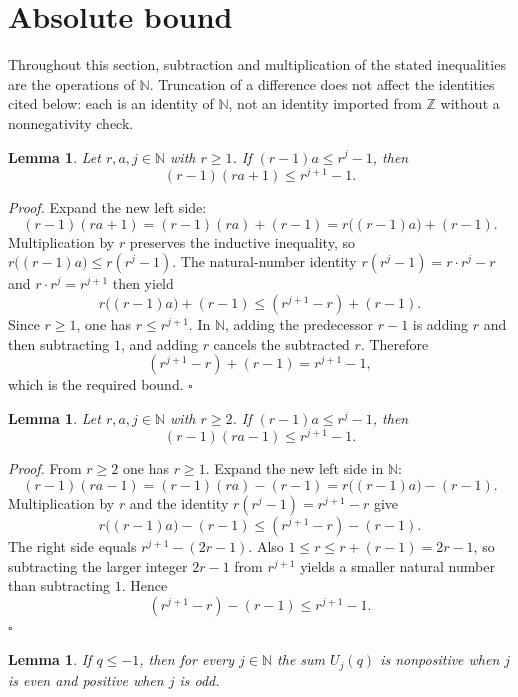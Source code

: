 \documentclass[11pt,letterpaper]{article}
\newcommand{\N}{\mathbb{N}}
\newcommand{\Z}{\mathbb{Z}}
\newtheorem{lemma}[theorem]{Lemma}
\newenvironment{proof}{\noindent\textit{Proof.}}{\hfill\(\square\)}
\begin{document}
\section{Absolute bound}

Throughout this section, subtraction and multiplication of the stated inequalities are the operations of \(\N\). Truncation of a difference does not affect the identities cited below: each is an identity of \(\N\), not an identity imported from \(\Z\) without a nonnegativity check.

\begin{lemma}
\label{lem:step-plus}
Let \(r,a,j\in\N\) with \(r\ge 1\). If \((r-1)a\le r^j-1\), then
\[
(r-1)(ra+1)\le r^{j+1}-1.
\]
\end{lemma}

\begin{proof}
Expand the new left side:
\[
(r-1)(ra+1)=(r-1)(ra)+(r-1)=r\bigl((r-1)a\bigr)+(r-1).
\]
Multiplication by \(r\) preserves the inductive inequality, so \(r\bigl((r-1)a\bigr)\le r(r^j-1)\). The natural-number identity \(r(r^j-1)=r\cdot r^j-r\) and \(r\cdot r^j=r^{j+1}\) then yield
\[
r\bigl((r-1)a\bigr)+(r-1)\le (r^{j+1}-r)+(r-1).
\]
Since \(r\ge 1\), one has \(r\le r^{j+1}\). In \(\N\), adding the predecessor \(r-1\) is adding \(r\) and then subtracting \(1\), and adding \(r\) cancels the subtracted \(r\). Therefore
\[
(r^{j+1}-r)+(r-1)=r^{j+1}-1,
\]
which is the required bound.
\end{proof}

\begin{lemma}
\label{lem:step-minus}
Let \(r,a,j\in\N\) with \(r\ge 2\). If \((r-1)a\le r^j-1\), then
\[
(r-1)(ra-1)\le r^{j+1}-1.
\]
\end{lemma}

\begin{proof}
From \(r\ge 2\) one has \(r\ge 1\). Expand the new left side in \(\N\):
\[
(r-1)(ra-1)=(r-1)(ra)-(r-1)=r\bigl((r-1)a\bigr)-(r-1).
\]
Multiplication by \(r\) and the identity \(r(r^j-1)=r^{j+1}-r\) give
\[
r\bigl((r-1)a\bigr)-(r-1)\le (r^{j+1}-r)-(r-1).
\]
The right side equals \(r^{j+1}-(2r-1)\). Also \(1\le r\le r+(r-1)=2r-1\), so subtracting the larger integer \(2r-1\) from \(r^{j+1}\) yields a smaller natural number than subtracting \(1\). Hence
\[
(r^{j+1}-r)-(r-1)\le r^{j+1}-1.
\]
\end{proof}

\begin{lemma}
\label{lem:sign}
If \(q\le -1\), then for every \(j\in\N\) the sum \(U_j(q)\) is nonpositive when \(j\) is even and positive when \(j\) is odd.
\end{lemma}
\end{document}
